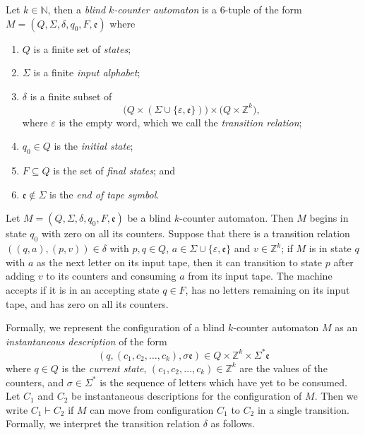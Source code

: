 \begin{definition}\label{defn:blind-k-counter-automata}
	Let $k \in \mathbb{N}$, then a \emph{blind $k$-counter automaton} is a $6$-tuple of the form $M = (Q,\Sigma,\delta,q_0,F, \mathfrak{e})$ where
	\begin{enumerate}
		\item $Q$ is a finite set of \emph{states};
		\item $\Sigma$ is a finite \emph{input alphabet};
		\item $\delta$ is a finite subset of
		\[
			\big(
				Q
				\times
				(\Sigma \cup \{\varepsilon, \mathfrak{e}\})
			\big)
			\times
			\big(
				Q
				\times
				\mathbb{Z}^k
			\big),
		\]
		where $\varepsilon$ is the empty word, which we call the \emph{transition relation};
		\item $q_0 \in Q$ is the \emph{initial state};
		\item $F \subseteq Q$ is the set of \emph{final states}; and
		\item $\mathfrak{e} \notin \Sigma$ is the \emph{end of tape symbol}.
	\end{enumerate}
\end{definition}

Let $M = (Q,\Sigma,\delta,q_0,F, \mathfrak{e})$ be a blind $k$-counter automaton.
Then $M$ begins in state $q_0$ with zero on all its counters.
Suppose that there is a transition relation $((q,a),(p,v)) \in \delta$ with $p,q \in Q$, $a \in \Sigma \cup \{\varepsilon,\mathfrak{e}\}$ and $v \in \mathbb{Z}^k$;
if $M$ is in state $q$ with $a$ as the next letter on its input tape, then it can transition to state $p$ after adding $v$ to its counters and consuming $a$ from its input tape.
The machine accepts if it is in an accepting state $q \in F$, has no letters remaining on its input tape, and has zero on all its counters.

Formally, we represent the configuration of a blind $k$-counter automaton $M$ as an \emph{instantaneous description} of the form
\[
	(
		q,(c_1,c_2,\ldots,c_k),\sigma\mathfrak{e}
	)
	\in Q \times \mathbb{Z}^k \times \Sigma^*\mathfrak{e}
\]
where $q \in Q$ is the \emph{current state}, $(c_1,c_2,\ldots,c_k) \in \mathbb{Z}^k$ are the values of the counters, and $\sigma \in \Sigma^*$ is the sequence of letters which have yet to be consumed.
Let $C_1$ and $C_2$ be instantaneous descriptions for the configuration of $M$.
Then we write $C_1 \vdash C_2$ if $M$ can move from configuration $C_1$ to $C_2$ in a single transition.
Formally, we interpret the transition relation $\delta$ as follows.

